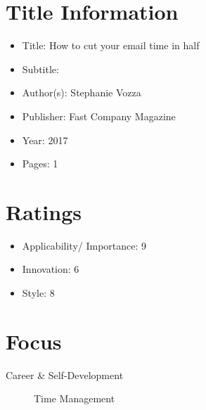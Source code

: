\documentclass[fleqn,10pt]{SelfArx} %
\begin{document}
\flushbottom %

\maketitle %


\thispagestyle{empty} %


\section*{Title Information} 


\begin{itemize}[noitemsep] 
\item Title: How to cut your email time in half
\item Subtitle:
\item Author(s): Stephanie Vozza
\item Publisher: Fast Company Magazine
\item Year: 2017
\item Pages: 1
\end{itemize}



\section*{Ratings}
\begin{itemize}[noitemsep] %
\item Applicability/ Importance: 9
\item Innovation: 6
\item Style: 8 
 
\end{itemize}

\section*{Focus}
\begin{description}
\item [Career \& Self-Development ]Time Management
\end{description}
\end{document}
